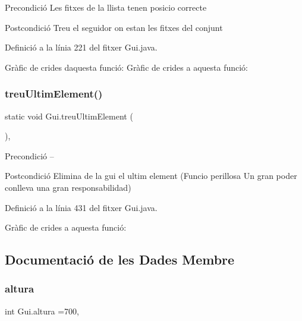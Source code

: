 \begin{DoxyPrecond}{Precondició}
Les fitxes de la llista tenen posicio correcte 
\end{DoxyPrecond}
\begin{DoxyPostcond}{Postcondició}
Treu el seguidor on estan les fitxes del conjunt 
\end{DoxyPostcond}


Definició a la línia 221 del fitxer Gui.\+java.

Gràfic de crides d\textquotesingle{}aquesta funció\+:
Gràfic de crides a aquesta funció\+:
\mbox{\label{class_gui_af97132d72a7474397afb22594b0119c5}} 
\subsubsection{\texorpdfstring{treu\+Ultim\+Element()}{treuUltimElement()}}
{\footnotesize\ttfamily static void Gui.\+treu\+Ultim\+Element (\begin{DoxyParamCaption}{ }\end{DoxyParamCaption})\hspace{0.3cm}{\ttfamily [static]}, {\ttfamily [private]}}

\begin{DoxyPrecond}{Precondició}
-- 
\end{DoxyPrecond}
\begin{DoxyPostcond}{Postcondició}
Elimina de la gui el ultim element (Funcio perillosa Un gran poder conlleva una gran responsabilidad) 
\end{DoxyPostcond}


Definició a la línia 431 del fitxer Gui.\+java.

Gràfic de crides a aquesta funció\+:


\subsection{Documentació de les Dades Membre}
\mbox{\label{class_gui_ad7509c136ef1dcfbc543aa3329ddfd9d}} 
\subsubsection{\texorpdfstring{altura}{altura}}
{\footnotesize\ttfamily int Gui.\+altura =700\hspace{0.3cm}{\ttfamily [static]}, {\ttfamily [private]}}



